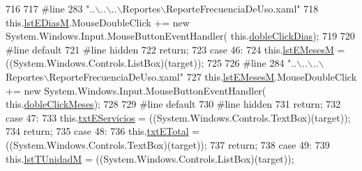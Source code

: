 \begin{DoxyCode}
716             
717 \textcolor{preprocessor}{            #line 283 "..\(\backslash\)..\(\backslash\)..\(\backslash\)Reportes\(\backslash\)ReporteFrecuenciaDeUso.xaml"}
718 \textcolor{preprocessor}{}            this.\hyperlink{class_proyecto___integrador__3_1_1_reportes_1_1_reporte_frecuencia_de_uso_a2b516015fab6b55141fe0b999e36e520}{lstEDiasM}.MouseDoubleClick += \textcolor{keyword}{new} System.Windows.Input.MouseButtonEventHandler(
      this.\hyperlink{class_proyecto___integrador__3_1_1_reportes_1_1_reporte_frecuencia_de_uso_a2ab966196c9bc681df237775e5084d8d}{dobleClickDias});
719             
720 \textcolor{preprocessor}{            #line default}
721 \textcolor{preprocessor}{}\textcolor{preprocessor}{            #line hidden}
722 \textcolor{preprocessor}{}            \textcolor{keywordflow}{return};
723             \textcolor{keywordflow}{case} 46:
724             this.\hyperlink{class_proyecto___integrador__3_1_1_reportes_1_1_reporte_frecuencia_de_uso_a5adb40758c162bfdc84fd55c49440e4e}{lstEMesesM} = ((System.Windows.Controls.ListBox)(target));
725             
726 \textcolor{preprocessor}{            #line 284 "..\(\backslash\)..\(\backslash\)..\(\backslash\)Reportes\(\backslash\)ReporteFrecuenciaDeUso.xaml"}
727 \textcolor{preprocessor}{}            this.\hyperlink{class_proyecto___integrador__3_1_1_reportes_1_1_reporte_frecuencia_de_uso_a5adb40758c162bfdc84fd55c49440e4e}{lstEMesesM}.MouseDoubleClick += \textcolor{keyword}{new} System.Windows.Input.MouseButtonEventHandler(
      this.\hyperlink{class_proyecto___integrador__3_1_1_reportes_1_1_reporte_frecuencia_de_uso_a50be2c40af6717361795d2ca8e9b6bf3}{dobleClickMeses});
728             
729 \textcolor{preprocessor}{            #line default}
730 \textcolor{preprocessor}{}\textcolor{preprocessor}{            #line hidden}
731 \textcolor{preprocessor}{}            \textcolor{keywordflow}{return};
732             \textcolor{keywordflow}{case} 47:
733             this.\hyperlink{class_proyecto___integrador__3_1_1_reportes_1_1_reporte_frecuencia_de_uso_a22182387460111695b414013af099899}{txtEServicios} = ((System.Windows.Controls.TextBox)(target));
734             \textcolor{keywordflow}{return};
735             \textcolor{keywordflow}{case} 48:
736             this.\hyperlink{class_proyecto___integrador__3_1_1_reportes_1_1_reporte_frecuencia_de_uso_a889f0abb3a420a38d963de4e364ef744}{txtETotal} = ((System.Windows.Controls.TextBox)(target));
737             \textcolor{keywordflow}{return};
738             \textcolor{keywordflow}{case} 49:
739             this.\hyperlink{class_proyecto___integrador__3_1_1_reportes_1_1_reporte_frecuencia_de_uso_ab12e78b5f637eefdfde63fba310cfaf5}{lstTUnidadM} = ((System.Windows.Controls.ListBox)(target));

\end{DoxyCode}
